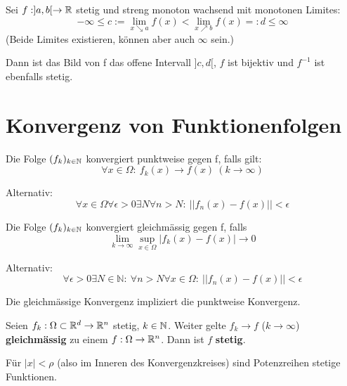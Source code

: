 \begin{theorem}
Sei $f:]a,b[\rightarrow\mathbb{R}$ stetig und streng monoton wachsend mit monotonen Limites: $$-\infty\leq c:=\lim_{x\searrow a}f(x) <\lim_{x\nearrow b}f(x)=:d\leq \infty$$ (Beide Limites existieren, können aber auch $\infty$ sein.)

Dann ist das Bild von f das offene Intervall $]c,d[$, $f$ ist bijektiv und $f^{-1}$ ist ebenfalls stetig.
\end{theorem}

\section{Konvergenz von Funktionenfolgen}

\begin{definition}
Die Folge $(f_k)_{k\in \mathbb{N}}$ konvergiert punktweise gegen f,
falls gilt:
$$\forall x \in \Omega: \ f_k(x)\to f(x) \ (k \to \infty)$$

Alternativ:
$$\forall x \in \Omega \forall \epsilon > 0 \exists N \forall n > N: \ ||f_n(x) - f(x)|| < \epsilon$$
\end{definition}

\begin{definition}
Die Folge $(f_k)_{k\in \mathbb{N}}$ konvergiert gleichmässig gegen f, falls
$$ \lim_{k \to \infty} \sup_{x \in \Omega} |f_k(x) - f(x)| \to 0$$

Alternativ:
$$\forall \epsilon > 0 \exists N \in \mathbb{N}: \ \forall n > N \forall x \in \Omega: \ ||f_n(x) - f(x)|| < \epsilon$$

Die gleichmässige Konvergenz impliziert die punktweise Konvergenz.
\end{definition}

\begin{theorem}
Seien $f_k : \Omega \subset \mathbb{R}^{d} \to \mathbb{R}^{n}$ stetig, $k \in \mathbb{N}$. Weiter gelte $f_k \to f$ ($k \to \infty$) \textbf{gleichmässig} zu einem $f : \Omega \to \mathbb{R}^n$. Dann ist $f$ \textbf{stetig}.
\end{theorem}

\begin{corollary}
Für $|x|<\rho$ (also im Inneren des Konvergenzkreises) sind Potenzreihen stetige Funktionen.
\end{corollary}
